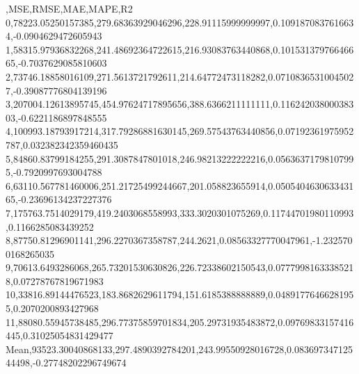 ,MSE,RMSE,MAE,MAPE,R2
0,78223.05250157385,279.68363929046296,228.91115999999997,0.1091870837616634,-0.0904629472605943
1,58315.97936832268,241.48692364722615,216.93083763440868,0.10153137976646665,-0.7037629085810603
2,73746.18858016109,271.5613721792611,214.64772473118282,0.07108365310045027,-0.39087776804139196
3,207004.12613895745,454.97624717895656,388.6366211111111,0.11624203800038303,-0.6221186897848555
4,100993.18793917214,317.79286881630145,269.57543763440856,0.07192361975952787,0.032382342359460435
5,84860.83799184255,291.3087847801018,246.98213222222216,0.05636371798107995,-0.7920997693004788
6,63110.567781460006,251.21725499244667,201.058823655914,0.050540463063343165,-0.23696134237227376
7,175763.7514029179,419.2403068558993,333.3020301075269,0.11744701980110993,0.1166285083439252
8,87750.81296901141,296.2270367358787,244.2621,0.08563327770047961,-1.2325700168265035
9,70613.6493286068,265.73201530630826,226.72338602150543,0.07779981633385218,0.07278767819671983
10,33816.89144476523,183.8682629611794,151.6185388888889,0.04891776466281955,0.2070200893427968
11,88080.55945738485,296.77375859701834,205.29731935483872,0.09769833157416445,0.31025054831429477
Mean,93523.30040868133,297.4890392784201,243.99550928016728,0.08369734712544498,-0.27748202296749674
